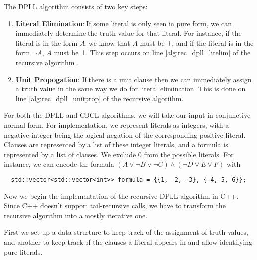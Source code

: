 \documentclass[10pt,AMS Euler]{article}
\begin{document}
The DPLL algorithm consists of two key steps:
\begin{enumerate}
\item \textbf{Literal Elimination}: If some literal is only seen in pure form, we can immediately determine the
truth value for that literal. For instance, if the literal is in the form \(A\), we know that \(A\) must be
\(\top\), and if the literal is in the form \(\neg A\), \(A\) must be \(\bot\). This step occurs on line
\ref{alg:rec_dpll_litelim} of the recursive algorithm .
\item \textbf{Unit Propogation}: If there is a unit clause then we can immediately assign a truth value in the same
way we do for literal elimination. This is done on line \ref{alg:rec_dpll_unitprop} of the recursive
algorithm.
\end{enumerate}

For both the DPLL and CDCL algorithms, we will take our input in conjunctive normal form. For implementation,
we represent literals as integers, with a negative integer being the logical negation of the corresponding
positive literal. Clauses are represented by a list of these integer literals, and a formula is represented
by a list of clauses. We exclude 0 from the possible literals.
For instance, we can encode the formula \((A \lor \neg B \lor \neg C) \land (\neg D \lor E \lor F)\) with
\begin{verbatim}
  std::vector<std::vector<int>> formula = {{1, -2, -3}, {-4, 5, 6}};
\end{verbatim}

Now we begin the implementation of the recursive DPLL algorithm in C++. Since C++ doesn't
support tail-recursive calls, we have to transform the recursive algorithm into a mostly
iterative one.

First we set up a data structure to keep track of the assignment of truth values, and another to keep
track of the clauses a literal appears in and allow identifying pure literals.
\end{document}
